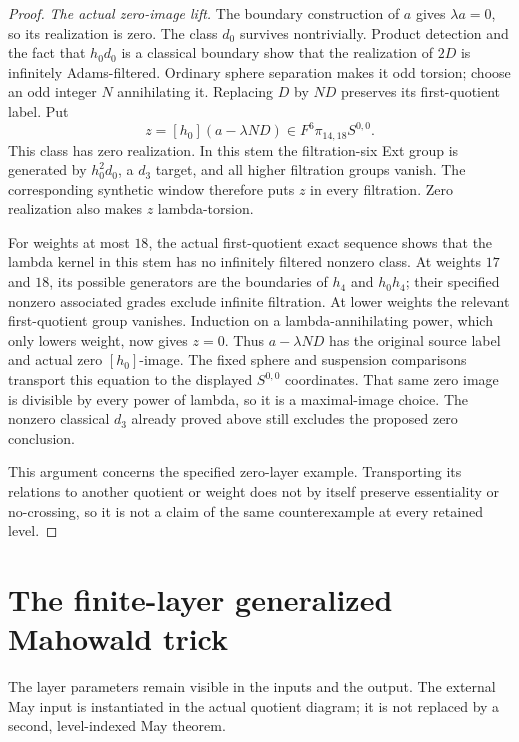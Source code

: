 \begin{proof}
\textit{The actual zero-image lift.} The boundary construction
of $a$ gives $\lambda a=0$, so its realization is zero.
The class $d_0$ survives nontrivially. Product detection and the
fact that $h_0d_0$ is a classical boundary show that the
realization of $2D$ is infinitely Adams-filtered. Ordinary
sphere separation makes it odd torsion; choose an odd integer
$N$ annihilating it. Replacing $D$ by $ND$ preserves its
first-quotient label. Put
\[
z=[h_0](a-\lambda ND)\in F^6\pi_{14,18}S^{0,0}.
\]
This class has zero realization. In this stem the filtration-six
Ext group is generated by $h_0^2d_0$, a $d_3$ target, and all
higher filtration groups vanish. The corresponding synthetic
window therefore puts $z$ in every filtration. Zero realization
also makes $z$ lambda-torsion.

For weights at most $18$, the actual first-quotient exact sequence
shows that the lambda kernel in this stem has no infinitely
filtered nonzero class. At weights $17$ and $18$, its possible
generators are the boundaries of $h_4$ and $h_0h_4$;
their specified nonzero associated grades exclude infinite
filtration. At lower weights the relevant first-quotient group
vanishes. Induction on a lambda-annihilating power, which only
lowers weight, now gives $z=0$. Thus $a-\lambda ND$ has the
original source label and actual zero $[h_0]$-image. The fixed
sphere and suspension comparisons transport this equation to
the displayed $S^{0,0}$ coordinates.
That same zero image is divisible by every power of lambda,
so it is a maximal-image choice. The nonzero classical $d_3$
already proved above still excludes the proposed zero conclusion.

This argument concerns the specified zero-layer example. Transporting its relations to another quotient or weight does not by itself preserve essentiality or no-crossing, so it is not a claim of the same counterexample at every retained level.
\end{proof}

\section{The finite-layer generalized Mahowald trick}

The layer parameters remain visible in the inputs and the output.
The external May input is instantiated in the actual quotient diagram;
it is not replaced by a second, level-indexed May theorem.

